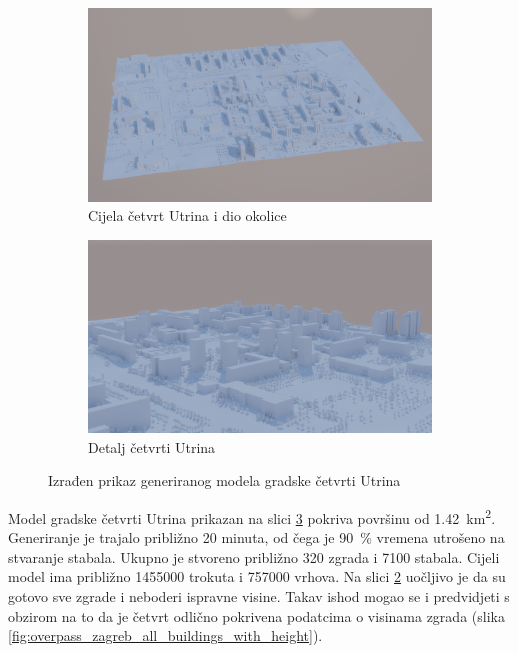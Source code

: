 \documentclass[times, utf8, zavrsni, numeric]{fer}
\begin{document}
	\begin{figure}[H]
		\centering
		\begin{subfigure}{\linewidth}
			\includegraphics[width=\linewidth]{figures/utrine_entire_render.jpg}
			\caption{Cijela četvrt Utrina i dio okolice}
			\label{fig:utrine_entire_render}
		\end{subfigure}
		\par\bigskip
		\begin{subfigure}{\linewidth}
			\includegraphics[width=\linewidth]{figures/utrine_detail_render.jpg}
			\caption{Detalj četvrti Utrina}
			\label{fig:utrine_detail_render}
		\end{subfigure}
		\caption{Izrađen prikaz generiranog modela gradske četvrti Utrina}
		\label{fig:utrine_renders}
	\end{figure}
	
	Model gradske četvrti Utrina prikazan na slici \ref{fig:utrine_renders} pokriva površinu od \SI{1.42}{\kilo\meter\squared}.
	Generiranje je trajalo približno \SI{20}{} minuta, od čega je \SI{90}{\percent} vremena utrošeno na stvaranje stabala.
	Ukupno je stvoreno približno \SI{320}{} zgrada i \SI{7 100}{} stabala.
	Cijeli model ima približno \SI{1 455 000}{} trokuta i \SI{757 000}{} vrhova.
	Na slici \ref{fig:utrine_detail_render} uočljivo je da su gotovo sve zgrade i neboderi ispravne visine.
	Takav ishod mogao se i predvidjeti s obzirom na to da je četvrt odlično pokrivena podatcima o visinama zgrada (slika \ref{fig:overpass_zagreb_all_buildings_with_height}).
	
\end{document}
